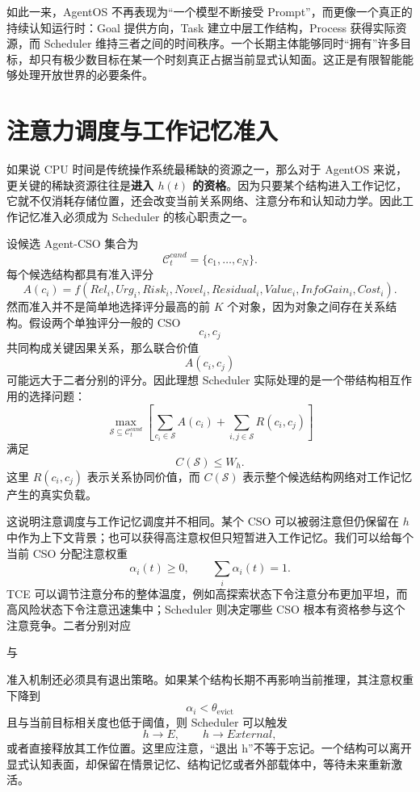 如此一来，AgentOS 不再表现为“一个模型不断接受 Prompt”，而更像一个真正的持续认知运行时：Goal 提供方向，Task 建立中层工作结构，Process 获得实际资源，而 Scheduler 维持三者之间的时间秩序。一个长期主体能够同时“拥有”许多目标，却只有极少数目标在某一个时刻真正占据当前显式认知面。这正是有限智能能够处理开放世界的必要条件。

\section{注意力调度与工作记忆准入}

如果说 CPU 时间是传统操作系统最稀缺的资源之一，那么对于 AgentOS 来说，更关键的稀缺资源往往是\textbf{进入 $h(t)$ 的资格}。因为只要某个结构进入工作记忆，它就不仅消耗存储位置，还会改变当前关系网络、注意分布和认知动力学。因此工作记忆准入必须成为 Scheduler 的核心职责之一。

设候选 Agent-CSO 集合为
\[
\mathcal C_t^{cand}
=
\{
c_1,\ldots,c_N
\}.
\]
每个候选结构都具有准入评分
\[
A(c_i)
=
f(
Rel_i,
Urg_i,
Risk_i,
Novel_i,
Residual_i,
Value_i,
InfoGain_i,
Cost_i
).
\]
然而准入并不是简单地选择评分最高的前 $K$ 个对象，因为对象之间存在关系结构。假设两个单独评分一般的 CSO
\[
c_i,c_j
\]
共同构成关键因果关系，那么联合价值
\[
A(c_i,c_j)
\]
可能远大于二者分别的评分。因此理想 Scheduler 实际处理的是一个带结构相互作用的选择问题：
\[
\max_{\mathcal S\subseteq\mathcal C_t^{cand}}
\left[
\sum_{c_i\in\mathcal S}A(c_i)
+
\sum_{i,j\in\mathcal S}R(c_i,c_j)
\right]
\]
满足
\[
C(\mathcal S)\leq W_h.
\]
这里 $R(c_i,c_j)$ 表示关系协同价值，而 $C(\mathcal S)$ 表示整个候选结构网络对工作记忆产生的真实负载。

这说明注意调度与工作记忆调度并不相同。某个 CSO 可以被弱注意但仍保留在 $h$ 中作为上下文背景；也可以获得高注意权但只短暂进入工作记忆。我们可以给每个当前 CSO 分配注意权重
\[
\alpha_i(t)\geq0,
\qquad
\sum_i\alpha_i(t)=1.
\]
TCE 可以调节注意分布的整体温度，例如高探索状态下令注意分布更加平坦，而高风险状态下令注意迅速集中；Scheduler 则决定哪些 CSO 根本有资格参与这个注意竞争。二者分别对应
\begin{statementbox}
\centering
{}
\end{statementbox}
与
\begin{statementbox}
\centering
{}
\end{statementbox}

准入机制还必须具有退出策略。如果某个结构长期不再影响当前推理，其注意权重下降到
\[
\alpha_i<\theta_{\mathrm{evict}}
\]
且与当前目标相关度也低于阈值，则 Scheduler 可以触发
\[
h\rightarrow E,
\qquad
h\rightarrow External,
\]
或者直接释放其工作位置。这里应注意，“退出 h”不等于忘记。一个结构可以离开显式认知表面，却保留在情景记忆、结构记忆或者外部载体中，等待未来重新激活。

